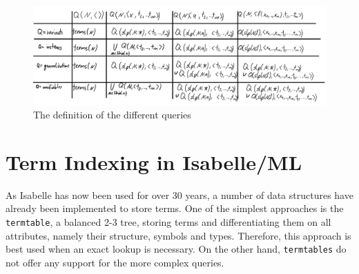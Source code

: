 \begin{figure}[h]
\centering
\includegraphics[scale=0.25]{figures/disc_net_queries.png}
\caption{The definition of the different queries}
\label{discnetqueries}
\end{figure}




\section{Term Indexing in Isabelle/ML}
As Isabelle has now been used for over 30 years, a number of data structures have already been implemented to store terms. One of the simplest approaches is the \verb!termtable!, a balanced 2-3 tree, storing terms and differentiating them on all attributes, namely their structure, symbols and types. Therefore, this approach is best used when an exact lookup is necessary. On the other hand, \verb!termtables! do not offer any support for the more complex queries.

